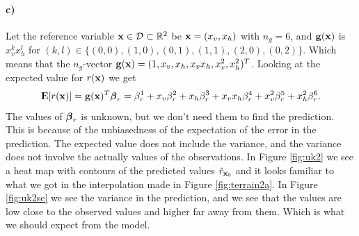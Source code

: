 \paragraph{c)}
Let the reference variable $\boldsymbol{\mathbf{x}} \in \mathcal{D} \subset \mathbb{R}^2$ be $\boldsymbol{\mathbf{x}} = (x_v, x_h)$ with $n_g = 6$, and $\boldsymbol{\mathbf{g}}(\boldsymbol{\mathbf{x}})$ is $x_v^kx_h^l$ for $(k,l) \in \{(0,0),(1,0),(0,1),(1,1),(2,0),(0,2)\}$. Which means that the $n_g$-vector $\boldsymbol{\mathbf{g}}(\boldsymbol{\mathbf{x}}) = (1,x_v,x_h,x_vx_h,x_v^2,x_h^2)^T$. Looking at the expected value for $r(\boldsymbol{\mathbf{x}})$ we get
\begin{equation*}
    {\rm I\kern-.3em E}[r(\boldsymbol{\mathbf{x}})] = \boldsymbol{\mathbf{g}}(\boldsymbol{\mathbf{x}})^T \boldsymbol{\mathbf{\beta}}_r = \beta_r^1 + x_v \beta_r^2 + x_h \beta_r^3 + x_v x_h \beta_r^4 + x_v^2 \beta_r^5 + x_h^2 \beta_r^6.
\end{equation*}
The values of $\boldsymbol{\mathbf{\beta}}_r$ is unknown, but we don't need them to find the prediction. This is because of the unbiasedness of the expectation of the error in the prediction. 
The expected value does not include the variance, and the variance does not involve the actually values of the observations. 
In Figure \ref{fig:uk2} we see a heat map with contours of the predicted values $\hat{r}_{\boldsymbol{\mathbf{x}}_0}$ and it looks familiar to what we got in the interpolation made in Figure \ref{fig:terrain2a}. In Figure \ref{fig:uk2se} we see the variance in the prediction, and we see that the values are low close to the observed values and higher far away from them. Which is what we should expect from the model.
